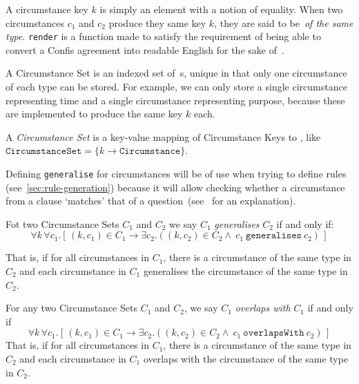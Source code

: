 A circumstance key $k$ is simply an element with a notion of equality.
When two circumstances $c_1$ and $c_2$ produce they same key $k$, they are said to be~\emph{of the same type}.
\texttt{render} is a function made to satisfy the requirement of being able to convert a Confis agreement into readable English for the sake of~.

A Circumstance Set is an indexed set of~s, unique in that only one circumstance of each type can be stored.
For example, we can only store a single circumstance representing time and a single circumstance representing purpose, because these are implemented to produce the same key $k$ each.

\begin{definition}
    \label{def:circumstanceSet}
    A \emph{Circumstance Set} is a key-value mapping of Circumstance Keys to , like $\texttt{CircumstanceSet} = \{ k \to \texttt{Circumstance} \}$.
\end{definition}

Defining \texttt{generalise} for circumstances will be of use when trying to define rules (see~\autoref{sec:rule-generation}) because it will allow checking whether a circumstance from a clause `matches' that of a question~(see~ for an explanation).

\begin{definition}
    Fot two Circumstance Sets $C_1$ and $C_2$ we say $C_1$ \emph{generalises} $C_2$ if and only if:
    \begin{equation}
        \label{eq:circumstanceSet:generalisation}
        \forall k \, \forall c_1.[ \, (k, c_1) \in C_1 \to
        \exists c_2.((k, c_2) \in C_2  \land\ c_1\ \texttt{generalises}\ c_2)\,]
    \end{equation}

    That is, if for all circumstances in $C_1$, there is a circumstance of the same type in $C_2$ and each circumstance in $C_1$ generalises the circumstance of the same type in $C_2$.
\end{definition}

\begin{definition}
    For any two Circumstance Sets $C_1$ and $C_2$, we say $C_1$ \emph{overlaps with} $C_1$ if and only if
    \begin{equation}
        \label{eq:circumstanceSet:overlap}
        \forall k \, \forall c_1.[ \, (k, c_1) \in C_1 \to
        \exists c_2.((k, c_2) \in C_2  \land\ c_1\ \texttt{overlapsWith}\ c_2)\,]
    \end{equation}
    That is, if for all circumstances in $C_1$, there is a circumstance of the same type in $C_2$ and each circumstance in $C_1$ overlaps with the circumstance of the same type in $C_2$.
\end{definition}

